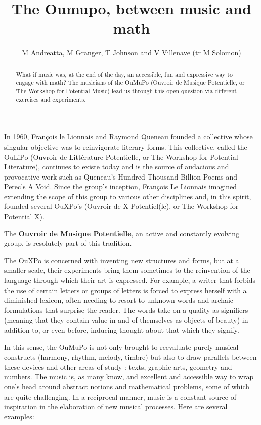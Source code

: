 \documentclass{article}
\title{The Oumupo, between music and math}
\author{M Andreatta, M Granger, T Johnson and V Villenave
(tr M Solomon)}
\begin{document}
\maketitle
\begin{abstract}
What if music was, at the end of the day, an accessible, fun and expressive way to engage with math? The musicians of the OuMuPo (Ouvroir de Musique Potentielle, or The Workshop for Potential Music) lead us through this open question via different exercises and experiments.
\end{abstract}

In 1960, François le Lionnais and Raymond Queneau founded a collective whose singular objective was to reinvigorate literary forms. This collective, called the OuLiPo (Ouvroir de Littérature Potentielle, or The Workshop for Potential Literature), continues to existe today and is the source of audacious and provocative work such as Queneau’s Hundred Thousand Billion Poems and Perec’s A Void. Since the group’s inception, François Le Lionnais imagined extending the scope of this group to various other disciplines and, in this spirit, founded several OuXPo’s (Ouvroir de X Potentiel(le), or The Workshop for Potential
X).


The \textbf{Ouvroir de Musique Potentielle}, an active and constantly evolving group, is resolutely part of this tradition.

The OuXPo is concerned with inventing new structures and forms, but at a smaller scale, their experiments bring them sometimes to the reinvention of the language through which their art is expressed.  For example, a writer that forbids the use of certain letters or groups of letters is forced to express herself with a diminished lexicon, often needing to resort to unknown words and archaic formulations that surprise the reader.  The words take on a quality as signifiers (meaning that they contain value in and of themselves as objects of beauty) in addition to, or even before, inducing thought about that which they signify.

In this sense, the OuMuPo is not only brought to reevaluate purely musical constructs (harmony, rhythm, melody, timbre) but also to draw parallels between these devices and other areas of study : texts, graphic arts, geometry and numbers.  The music is, as many know, and excellent and accessible way to wrap one’s head around abstract notions and mathematical problems, some of which are quite challenging.  In a reciprocal manner, music is a constant source of inspiration in the elaboration of new musical processes.  Here are several examples:
\end{document}
